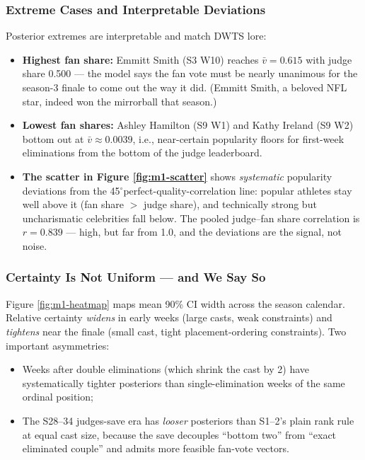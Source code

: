 \documentclass{article}
\newcommand{\degree}{\ensuremath{^\circ}}
\begin{document}
\subsubsection{Extreme Cases and Interpretable Deviations}

Posterior extremes are interpretable and match DWTS lore:
\begin{itemize}
  \item \textbf{Highest fan share:} Emmitt Smith (S3 W10) reaches $\bar v = 0.615$ with judge share 0.500 --- the model says the fan vote must be nearly unanimous for the season-3 finale to come out the way it did. (Emmitt Smith, a beloved NFL star, indeed won the mirrorball that season.)
  \item \textbf{Lowest fan shares:} Ashley Hamilton (S9 W1) and Kathy Ireland (S9 W2) bottom out at $\bar v \approx 0.0039$, i.e., near-certain popularity floors for first-week eliminations from the bottom of the judge leaderboard.
  \item \textbf{The scatter in Figure \ref{fig:m1-scatter}} shows \emph{systematic} popularity deviations from the 45\degree perfect-quality-correlation line: popular athletes stay well above it (fan share $>$ judge share), and technically strong but uncharismatic celebrities fall below. The pooled judge--fan share correlation is $r = 0.839$ --- high, but far from 1.0, and the deviations are the signal, not noise.
\end{itemize}

\subsubsection{Certainty Is Not Uniform --- and We Say So}

Figure \ref{fig:m1-heatmap} maps mean 90\% CI width across the season calendar. Relative certainty \emph{widens} in early weeks (large casts, weak constraints) and \emph{tightens} near the finale (small cast, tight placement-ordering constraints). Two important asymmetries:
\begin{itemize}
  \item Weeks after double eliminations (which shrink the cast by 2) have systematically tighter posteriors than single-elimination weeks of the same ordinal position;
  \item The S28--34 judges-save era has \emph{looser} posteriors than S1--2's plain rank rule at equal cast size, because the save decouples ``bottom two'' from ``exact eliminated couple'' and admits more feasible fan-vote vectors.
\end{itemize}
\end{document}
